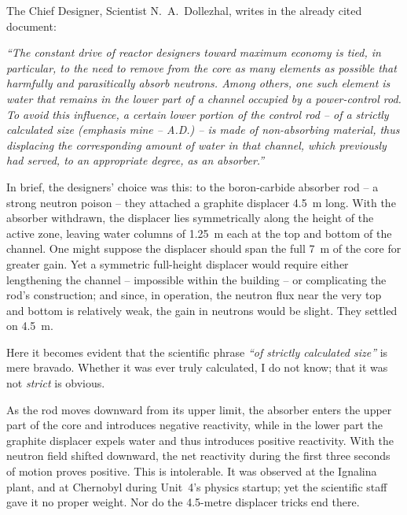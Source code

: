 \documentclass[openright]{bookest}
\begin{document}
The Chief Designer, Scientist N.~A.~Dollezhal, writes in the already cited document:

\begin{personal}
\textit{``The constant drive of reactor designers toward maximum economy is tied, in particular, to the need to remove from the core as many elements as possible that harmfully and parasitically absorb neutrons. Among others, one such element is water that remains in the lower part of a channel occupied by a power-control rod. To avoid this influence, a certain lower portion of the control rod -- of a strictly calculated size (emphasis mine -- A.D.) -- is made of non-absorbing material, thus displacing the corresponding amount of water in that channel, which previously had served, to an appropriate degree, as an absorber.''}
\end{personal}

In brief, the designers' choice was this: to the boron-carbide absorber rod -- a strong neutron poison -- they attached a graphite displacer \qty{4.5}{\metre} long. With the absorber withdrawn, the displacer lies symmetrically along the height of the active zone, leaving water columns of \qty{1.25}{\metre} each at the top and bottom of the channel. One might suppose the displacer should span the full \qty{7}{\metre} of the core for greater gain. Yet a symmetric full-height displacer would require either lengthening the channel -- impossible within the building -- or complicating the rod's construction; and since, in operation, the neutron flux near the very top and bottom is relatively weak, the gain in neutrons would be slight. They settled on \qty{4.5}{\metre}.

Here it becomes evident that the scientific phrase \textit{``of strictly calculated size''} is mere bravado. Whether it was ever truly calculated, I do not know; that it was not \textit{strict} is obvious.

As the rod moves downward from its upper limit, the absorber enters the upper part of the core and introduces negative reactivity, while in the lower part the graphite displacer expels water and thus introduces positive reactivity. With the neutron field shifted downward, the net reactivity during the first three seconds of motion proves positive. This is intolerable. It was observed at the Ignalina plant, and at Chernobyl during Unit~4's physics startup; yet the scientific staff gave it no proper weight. Nor do the \num{4.5}-metre displacer tricks end there.
\end{document}
